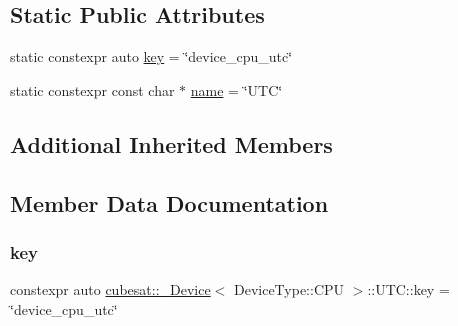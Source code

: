 \subsection*{Static Public Attributes}
\begin{DoxyCompactItemize}
\item 
static constexpr auto \hyperlink{structcubesat_1_1__Device_3_01DeviceType_1_1CPU_01_4_1_1UTC_ac2f253e53b0641014d16773a5a944170}{key} = \char`\"{}device\+\_\+cpu\+\_\+utc\char`\"{}
\item 
static constexpr const char $\ast$ \hyperlink{structcubesat_1_1__Device_3_01DeviceType_1_1CPU_01_4_1_1UTC_a5916d64e782ecba4c29e1e116b93cec0}{name} = \char`\"{}U\+TC\char`\"{}
\end{DoxyCompactItemize}
\subsection*{Additional Inherited Members}


\subsection{Member Data Documentation}
\mbox{\label{structcubesat_1_1__Device_3_01DeviceType_1_1CPU_01_4_1_1UTC_ac2f253e53b0641014d16773a5a944170}} 
\subsubsection{\texorpdfstring{key}{key}}
{\footnotesize\ttfamily constexpr auto \hyperlink{structcubesat_1_1__Device}{cubesat\+::\+\_\+\+Device}$<$ Device\+Type\+::\+C\+PU $>$\+::U\+T\+C\+::key = \char`\"{}device\+\_\+cpu\+\_\+utc\char`\"{}\hspace{0.3cm}{\ttfamily [static]}}

\mbox{\label{structcubesat_1_1__Device_3_01DeviceType_1_1CPU_01_4_1_1UTC_a5916d64e782ecba4c29e1e116b93cec0}} 
